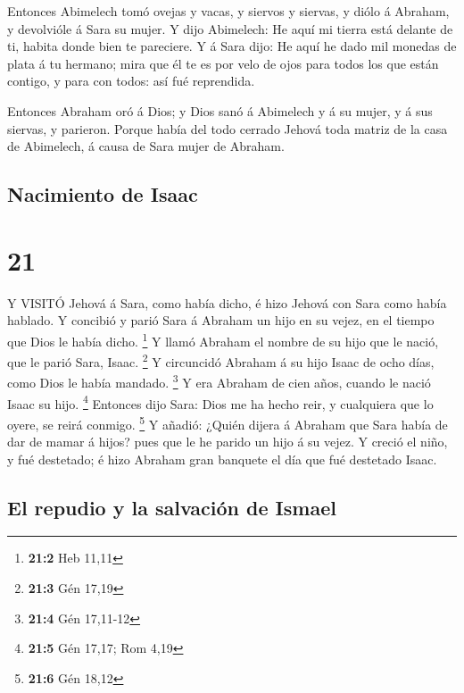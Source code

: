  Entonces Abimelech tomó ovejas y vacas, y siervos y
siervas, y diólo á Abraham, y devolvióle á Sara su mujer. 
Y dijo Abimelech: He aquí mi tierra está delante de ti, habita donde
bien te pareciere.  Y á Sara dijo: He aquí he dado mil
monedas de plata á tu hermano; mira que él te es por velo de ojos para
todos los que están contigo, y para con todos: así fué reprendida.

 Entonces Abraham oró á Dios; y Dios sanó á Abimelech y á
su mujer, y á sus siervas, y parieron.  Porque había del
todo cerrado Jehová toda matriz de la casa de Abimelech, á causa de Sara
mujer de Abraham.

\hypertarget{nacimiento-de-isaac}{%
\subsection{Nacimiento de Isaac}\label{nacimiento-de-isaac}}

\hypertarget{section-20}{%
\section{21}\label{section-20}}

 Y VISITÓ Jehová á Sara, como había dicho, é hizo Jehová con
Sara como había hablado.  Y concibió y parió Sara á Abraham
un hijo en su vejez, en el tiempo que Dios le había dicho. \footnote{\textbf{21:2}
  Heb 11,11}  Y llamó Abraham el nombre de su hijo que le
nació, que le parió Sara, Isaac. \footnote{\textbf{21:3} Gén 17,19}
 Y circuncidó Abraham á su hijo Isaac de ocho días, como
Dios le había mandado. \footnote{\textbf{21:4} Gén 17,11-12}
 Y era Abraham de cien años, cuando le nació Isaac su hijo.
\footnote{\textbf{21:5} Gén 17,17; Rom 4,19}  Entonces dijo
Sara: Dios me ha hecho reir, y cualquiera que lo oyere, se reirá
conmigo. \footnote{\textbf{21:6} Gén 18,12}  Y añadió:
¿Quién dijera á Abraham que Sara había de dar de mamar á hijos? pues que
le he parido un hijo á su vejez.  Y creció el niño, y fué
destetado; é hizo Abraham gran banquete el día que fué destetado Isaac.

\hypertarget{el-repudio-y-la-salvaciuxf3n-de-ismael}{%
\subsection{El repudio y la salvación de
Ismael}\label{el-repudio-y-la-salvaciuxf3n-de-ismael}}

